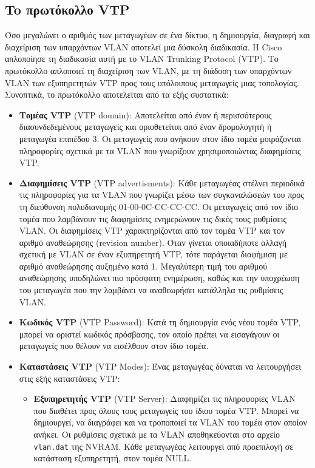 \documentclass{EdipyLabs} %
\begin{document}
\subsection{To πρωτόκολλο VTP}
Όσο μεγαλώνει ο αριθμός των μεταγωγέων σε ένα δίκτυο, η δημιουργία, διαγραφή και διαχείριση των υπαρχόντων VLAN αποτελεί μια δύσκολη διαδικασία. Η Cisco απλοποίησε τη διαδικασία αυτή με το VLAN Trunking Protocol (VTP). Το πρωτόκολλο απλοποιεί τη διαχείριση των VLAN, με τη διάδοση των υπαρχόντων VLAN των εξυπηρετητών VTP προς τους υπόλοιπους μεταγωγείς μιας τοπολογίας. Συνοπτικά, το πρωτόκολλο αποτελείται από τα εξής συστατικά:
\begin{itemize}
	\item \textbf{Τομέας VTP} (VTP domain): Αποτελείται από έναν ή περισσότερους διασυνδεδεμένους μεταγωγείς και οριοθετείται από έναν δρομολογητή ή μεταγωγέα επιπέδου 3. Οι μεταγωγείς που ανήκουν στον ίδιο τομέα μοιράζονται πληροφορίες σχετικά με τα VLAN που γνωρίζουν χρησιμοποιώντας διαφημίσεις VTP.
	\item \textbf{Διαφημίσεις VTP} (VTP advertisments): Κάθε μεταγωγέας στέλνει περιοδικά τις πληροφορίες για τα VLAN που γνωρίζει μέσω των συγκαναλώσεών του προς τη διεύθυνση πολυδιανομής 01-00-0C-CC-CC-CC. Οι μεταγωγείς από τον ίδιο τομέα που λαμβάνουν τις διαφημίσεις ενημερώνουν τις δικές τους ρυθμίσεις VLAN. Οι διαφημίσεις VTP χαρακτηρίζονται από τον τομέα VTP και τον αριθμό αναθεώρησης (revision number). Όταν γίνεται οποιαδήποτε αλλαγή σχετική με VLAN σε έναν εξυπηρετητή VTP, τότε παράγεται διαφήμιση με αριθμό αναθεώρησης αυξημένο κατά 1. Μεγαλύτερη τιμή του αριθμού αναθεώρησης υποδηλώνει πιο πρόσφατη ενημέρωση, καθώς και την υποχρέωση του μεταγωγέα που την λαμβάνει να αναθεωρήσει κατάλληλα τις ρυθμίσεις VLAN.
	\item \textbf{Κωδικός VTP} (VTP Password): Κατά τη δημιουργία ενός νέου τομέα VTP, μπορεί να οριστεί κωδικός πρόσβασης, τον οποίο πρέπει να εισαγάγουν οι μεταγωγείς που θέλουν να εισέλθουν στον ίδιο τομέα.
	\item \textbf{Καταστάσεις VTP} (VTP Modes): Ένας μεταγωγέας δύναται να λειτουργήσει στις εξής καταστάσεις VTP:
	\begin{itemize}
		\item \textbf{Εξυπηρετητής VTP} (VTP Server): Διαφημίζει τις πληροφορίες VLAN που διαθέτει προς όλους τους μεταγωγείς του ίδιου τομέα VTP. Μπορεί να δημιουργεί, να διαγράφει και να τροποποιεί τα VLAN του τομέα στον οποίον ανήκει. Οι ρυθμίσεις σχετικά με τα VLAN αποθηκεύονται στο αρχείο \texttt{vlan.dat} της NVRAM. Κάθε μεταγωγέας λειτουργεί από προεπιλογή σε κατάσταση εξυπηρετητή, στον τομέα NULL. 

\end{itemize}
\end{itemize}
\end{document}
